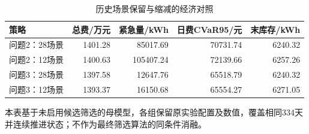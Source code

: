\begin{table}[htbp]\centering\small
\caption{历史场景保留与缩减的经济对照}
\label{tab:v2_scenarios}
\begin{tabularx}{\linewidth}{LRRRR}\toprule
策略 & 总费/万元 & 紧急量/kWh & 日费CVaR95/元 & 末库存/kWh\\\midrule
问题2：28场景 & 1401.28 & 85017.69 & 70731.74 & 6240.32\\
问题2：12场景 & 1400.63 & 105407.24 & 72139.66 & 6257.26\\
问题3：28场景 & 1397.58 & 12647.76 & 65518.79 & 6240.32\\
问题3：12场景 & 1393.37 & 16150.68 & 65554.27 & 6271.05\\
\bottomrule\end{tabularx}
\par\smallskip\parbox{\linewidth}{\footnotesize 本表基于未启用候选筛选的母模型，各组保留原实验配置及数值，覆盖相同334天并连续推进状态；不作为最终筛选算法的同条件消融。}
\end{table}

